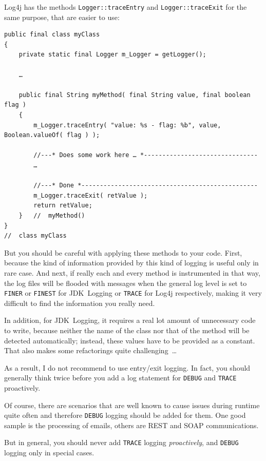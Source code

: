 Log4j has the methods \lstinline|Logger::traceEntry| and \lstinline|Logger::traceExit| for the same purpose, that are easier to use:
\begin{lstlisting}
public final class myClass
{
    private static final Logger m_Logger = getLogger();
    
	…    
    
    public final String myMethod( final String value, final boolean flag )
    {
        m_Logger.traceEntry( "value: %s - flag: %b", value, Boolean.valueOf( flag ) );
        
        //---* Does some work here … *-------------------------------
        …
    
        //---* Done *------------------------------------------------
        m_Logger.traceExit( retValue );
        return retValue;
    }   //  myMethod()
}
//  class myClass
\end{lstlisting}

But you should be careful with applying these methods to your code. First, because the kind of information provided by this kind of logging is useful only in rare case. And next, if really each and every method is instrumented in that way, the log files will be flooded with messages when the general log level is set to \verb#FINER# or \verb#FINEST# for JDK~Logging or \verb#TRACE# for Log4j respectively, making it very difficult to find the information you really need.

In addition, for JDK~Logging, it requires a real lot amount of unnecessary code to write, because neither the name of the class nor that of the method will be detected automatically; instead, these values have to be provided as a constant. That also makes some refactorings quite challenging~…

As a result, I do not recommend to use entry/exit logging. In fact, you should generally think twice before you add a log statement for \verb#DEBUG# and \verb#TRACE# proactively.

Of course, there are scenarios that are well known to cause issues during runtime quite often and therefore \verb#DEBUG# logging should be added for them. One good sample is the processing of emails, others are REST and SOAP communications.

But in general, you should never add \verb#TRACE# logging \textit{proactively}, and \verb#DEBUG# logging only in special cases.

